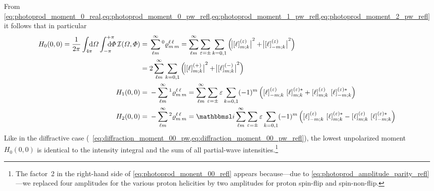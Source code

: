 From
\cref{eq:photoprod_moment_0_real,eq:photoprod_moment_0_pw_refl,eq:photoprod_moment_1_pw_refl,eq:photoprod_moment_2_pw_refl}
it follows that in particular
\begin{align}
  H_0(0, 0)
  = \frac{1}{2 \pi} \int_{4 \pi}\!\!\!\! \dif{\Omega} \int_{-\pi}^{+\pi}\hspace{-1.2em} \dif{\Phi}\,
  \intensity(\Omega, \Phi)
  ={}& \sum_{\ell m}^\infty \prescript{0}{}{\varrho}^{\ell\, \ell}_{m\, m}
  = \sum_{\ell m}^\infty \sum_{\refl = \pm} \sum_{k = 0, 1}
  \rBrk[2]{\Abs[1]{\sBrk{\ell}^{(\refl)}_{m; k}}^2 + \Abs[1]{\sBrk{\ell}^{(\refl)}_{{-m}; k}}^2} \nonumber
  \\
  \label{eq:photoprod_monent_00_refl}
  ={}& 2 \sum_{\ell m}^\infty \sum_{k = 0, 1}
  \rBrk[2]{\Abs[1]{\sBrk{\ell}^{(+)}_{m; k}}^2 + \Abs[1]{\sBrk{\ell}^{(-)}_{m; k}}^2}
  \\
  H_1(0, 0)
  ={}& -\sum_{\ell m}^\infty \prescript{1}{}{\varrho}^{\ell\, \ell}_{m\, m}
  = \sum_{\ell m}^\infty \sum_{\refl = \pm} \refl \sum_{k = 0, 1}
  (-1)^m \rBrk[2]{\sBrk{\ell}^{(\refl)}_{{-m}; k}\, \sBrk{\ell}^{(\refl) *}_{m; k}
  + \sBrk{\ell}^{(\refl)}_{m; k}\, \sBrk{\ell}^{(\refl) *}_{{-m}; k}}
  \\
  H_2(0, 0)
  ={}& -\sum_{\ell m}^\infty \prescript{2}{}{\varrho}^{\ell\, \ell}_{m\, m}
  = \imag \sum_{\ell m}^\infty \sum_{\refl = \pm} \refl \sum_{k = 0, 1}
  (-1)^m \rBrk[2]{\sBrk{\ell}^{(\refl)}_{{-m}; k}\, \sBrk{\ell}^{(\refl) *}_{m; k}
  - \sBrk{\ell}^{(\refl)}_{m; k}\, \sBrk{\ell}^{(\refl) *}_{{-m}; k}}
\end{align}
Like in the diffractive case (\confer\
\cref{eq:diffraction_moment_00_pw,eq:diffraction_moment_00_pw_refl}),
the lowest unpolarized moment $H_0(0, 0)$ is identical to the
intensity integral and the sum of all partial-wave
intensities.\footnote{The factor~2 in the right-hand side of
\cref{eq:photoprod_monent_00_refl} appears because---due to
\cref{eq:photoprod_amplitude_parity_refl}---we replaced four
amplitudes for the various proton helicities by two amplitudes for
proton spin-flip and spin-non-flip.}

